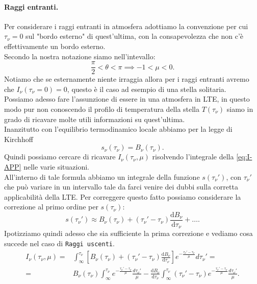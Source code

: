 \paragraph{Raggi entranti.}
Per considerare i raggi entranti in atmosfera adottiamo la convenzione per cui $\tau _{\nu} = 0$ sul "bordo esterno" di quest'ultima, con la consapevolezza che non c'è effettivamente un bordo esterno.\\
Secondo la nostra notazione siamo nell'intevallo:
\[
	\frac{\pi}{2}< \theta < \pi \implies -1 < \mu < 0 
.\] 
Notiamo che se esternamente niente irraggia allora per i raggi entranti avremo che $I_{\nu} ( \tau _{\nu} = 0) = 0$, questo è il caso ad esempio di una stella solitaria.\\

Possiamo adesso fare l'assunzione di essere in una atmosfera in LTE, in questo modo pur non conoscendo il profilo di temperatura della stella $T( \tau _{\nu} ) $ siamo in grado di ricavare molte utili informazioni su quest'ultima.\\
Inanzitutto con l'equilibrio termodinamico locale abbiamo per la legge di Kirchhoff
\[
	s_{\nu} ( \tau _{\nu} ) = B_{\nu} ( \tau _{\nu} ) 
.\] 
Quindi possiamo cercare di ricavare $I_{\nu} ( \tau _{\nu}, \mu  ) $ risolvendo l'integrale della \ref{eq:I-APP} nelle varie situazioni.\\
All'interno di tale formula abbiamo un integrale della funzione $s( \tau _{\nu} ') $, con  $\tau _{\nu} '$ che può variare in un intervallo tale da farci venire dei dubbi sulla corretta applicabilità della LTE. Per correggere questo fatto possiamo considerare la correzione al primo ordine per $s( \tau _{\nu} ) $:
\[
	s( \tau _{\nu}' ) \approx B_{\nu} ( \tau _{\nu} ) + ( \tau _{\nu} ' - \tau _{\nu} ) \frac{\mbox{d} B_{\nu} }{\mbox{d} \tau _{\nu} } + \ldots
.\] 
Ipotizziamo quindi adesso che sia sufficiente la prima correzione e vediamo cosa succede nel caso di \texttt{Raggi uscenti}.
\begin{align}
	I_{\nu} ( \tau _{\nu} , \mu ) =&  \int_{\infty}^{\tau _{\nu} } \left[ B_{\nu} ( \tau _{\nu} ) + \left( \tau _{\nu} ' - \tau _{\nu}   \right) \frac{\mbox{d} B_{\nu} }{\mbox{d} \tau _{\nu} } \right] e^{-\frac{\tau _{\nu} ' -\tau _{\nu} }{\mu }} d\tau _{\nu} ' = \\
	= & B_{\nu} ( \tau _{\nu} ) \int_{\infty}^{\tau _{\nu} } e^{-\frac{\tau _{\nu} ' -\tau _{\nu} }{\mu }} \frac{d\tau _{\nu} '}{\mu } -
	\frac{\mbox{d} B_{\nu} }{\mbox{d} \tau _{\nu} } \int_{\infty}^{\tau _{\nu} }  \left( \tau _{\nu} ' - \tau _{\nu}  \right) e^{-\frac{\tau _{\nu} ' -\tau _{\nu} }{\mu }} \frac{d\tau _{\nu} '}{\mu }
.\end{align}
